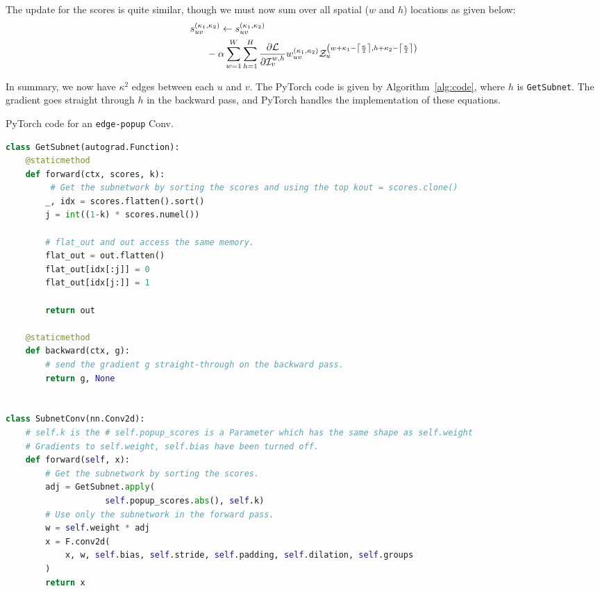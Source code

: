 \documentclass[10pt,twocolumn,letterpaper]{article}
\newcommand*{\I}{\mathcal{I}}
\newcommand*{\loss}{\mathcal{L}}
\newcommand*{\Z}{\mathcal{Z}}
\newcommand{\alg}{\texttt{edge-popup} }
\begin{document}
The update for the scores is quite similar, though we must now sum over all spatial (\ie $w$ and $h$) locations as given below:
\begin{equation} \label{eq:update-rule3}
\begin{split}
    & s_{uv}^{(\kappa_1, \kappa_2)} \gets s_{uv}^{(\kappa_1, \kappa_2)} \\
    & \ \ \ \ \ - \alpha \sum_{w=1}^W \sum_{h=1}^H \pdv{\loss}{\I_{v}^{w,h}} w_{uv}^{(\kappa_1, \kappa_2)} \Z_u^{\left(w+\kappa_1 -
    \left\lceil\frac{\kappa}{2}\right\rceil, h+\kappa_2 - \left\lceil\frac{\kappa}{2}\right\rceil\right)}
\end{split}
\end{equation}

In summary, we now have $\kappa^2$ edges between each $u$ and $v$.
The PyTorch \cite{pytorch} code is given by Algorithm~\ref{alg:code}, where $h$ is \texttt{GetSubnet}. The gradient goes straight through $h$ in the backward pass, and PyTorch handles the implementation of these equations.


\begin{algorithm}[t]
\caption{PyTorch code for an \alg Conv.}
\label{alg:code}
\begin{lstlisting}[language=python]
class GetSubnet(autograd.Function):
    @staticmethod
    def forward(ctx, scores, k):
         # Get the subnetwork by sorting the scores and using the top kout = scores.clone()
        _, idx = scores.flatten().sort()
        j = int((1-k) * scores.numel())

        # flat_out and out access the same memory.
        flat_out = out.flatten()
        flat_out[idx[:j]] = 0
        flat_out[idx[j:]] = 1

        return out

    @staticmethod
    def backward(ctx, g):
        # send the gradient g straight-through on the backward pass.
        return g, None
        

class SubnetConv(nn.Conv2d):
    # self.k is the # self.popup_scores is a Parameter which has the same shape as self.weight
    # Gradients to self.weight, self.bias have been turned off.
    def forward(self, x):
        # Get the subnetwork by sorting the scores.
        adj = GetSubnet.apply(
                    self.popup_scores.abs(), self.k)
        # Use only the subnetwork in the forward pass.
        w = self.weight * adj
        x = F.conv2d(
            x, w, self.bias, self.stride, self.padding, self.dilation, self.groups
        )
        return x
        
\end{lstlisting}
\end{algorithm}
\end{document}

